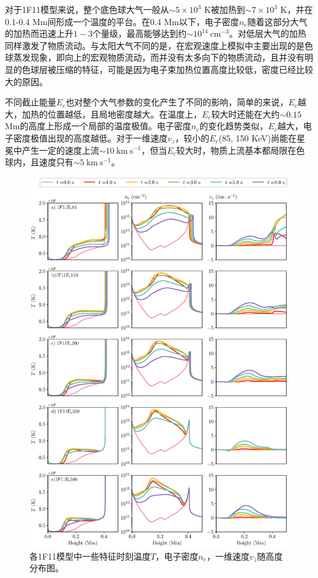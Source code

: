 对于1F11模型来说，整个底色球大气一般从$\sim 5\times 10^3$ K被加热到$\sim 7\times 10^3$ K，并在0.1-0.4 Mm间形成一个温度的平台。在0.4 Mm以下，电子密度$n_e$随着这部分大气的加热而迅速上升$1-3$个量级，最高能够达到约$\sim 10^{14}\ \mathrm{cm^{-3}}$。对低层大气的加热同样激发了物质流动。与太阳大气不同的是，在宏观速度上模拟中主要出现的是色球蒸发现象，即向上的宏观物质流动，而并没有太多向下的物质流动，且并没有明显的色球层被压缩的特征，可能是因为电子束加热位置高度比较低，密度已经比较大的原因。

不同截止能量$E_c$也对整个大气参数的变化产生了不同的影响，简单的来说，$E_c$越大，加热的位置越低，且局地密度越大。在温度上，$E_c$较大时还能在大约$\sim 0.15$ Mm的高度上形成一个局部的温度极值。电子密度$n_e$的变化趋势类似，$E_c$越大，电子密度极值出现的高度越低。对于一维速度$v_z$，较小的$E_c$(85, 150 KeV)尚能在星冕中产生一定的速度上流$\sim 10\ \mathrm{km \  s^{-1}}$，但当$E_c$较大时，物质上流基本都局限在色球内，且速度只有$\sim 5\ \mathrm{km \  s^{-1}}$。

\begin{figure}
	\centering
	\includegraphics[width=\textwidth]{figs/dMe_atoms_1}
	\caption{各1F11模型中一些特征时刻温度$T$，电子密度$n_e$，一维速度$v_z$随高度分布图。}
	\label{fig:4.1}
\end{figure}

